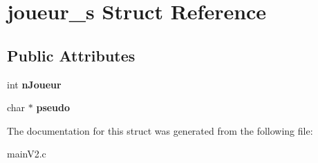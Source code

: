 \hypertarget{structjoueur__s}{}\section{joueur\+\_\+s Struct Reference}
\label{structjoueur__s}
\subsection*{Public Attributes}
\begin{DoxyCompactItemize}
\item 
\mbox{\label{structjoueur__s_aedfc8ad578fa392bbb5a8d5383aaa209}} 
int {\bfseries n\+Joueur}
\item 
\mbox{\label{structjoueur__s_a71567e658664676593283e2cc12640cd}} 
char $\ast$ {\bfseries pseudo}
\end{DoxyCompactItemize}


The documentation for this struct was generated from the following file\+:\begin{DoxyCompactItemize}
\item 
main\+V2.\+c\end{DoxyCompactItemize}
